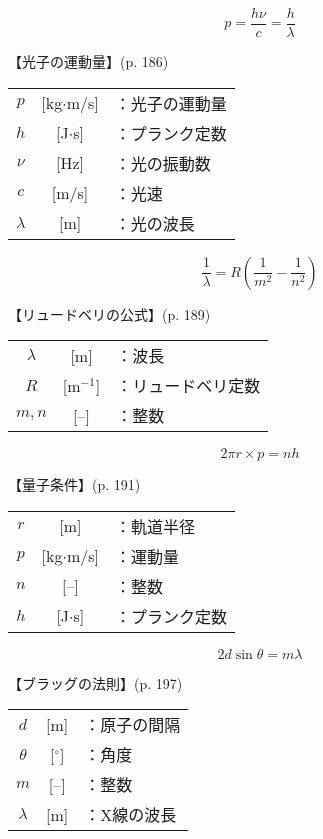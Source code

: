 \documentclass[10pt]{jarticle}
\begin{document}
\newpage
\[
  p = \frac{h\nu}{c} = \frac{h}{\lambda}
\]


\vskip3mm
\noindent
【光子の運動量】{\footnotesize (p. 186)}

\begin{tabular}{ccl}
$p$	&[kg$\cdot$m/s]	&：光子の運動量 \\
$h$	&{[J$\cdot$s]}	&：プランク定数 \\
$\nu$	&[Hz]	&：光の振動数 \\
$c$	&[m/s]	&：光速 \\
$\lambda$	&[m]	&：光の波長 \\
\end{tabular}





\newpage
\[
  \frac{1}{\lambda} = R \left(\frac{1}{m^2} - \frac{1}{n^2} \right)
\]


\vskip3mm
\noindent
【リュードベリの公式】{\footnotesize (p. 189)}

\begin{tabular}{ccl}
$\lambda$	&[m]	&：波長 \\
  $R$	&[m$^{-1}$]	&：リュードベリ定数 \\
$m, n$	&[--]	&：整数
\end{tabular}





\newpage
\[
  2 \pi r \times p = nh
\]


\vskip3mm
\noindent
【量子条件】{\footnotesize (p. 191)}

\begin{tabular}{ccl}
$r$	&[m]	&：軌道半径 \\
$p$	&[kg$\cdot$m/s]	&：運動量 \\
$n$	&[--]	&：整数 \\
$h$	&{[J$\cdot$s]}	&：プランク定数
\end{tabular}



\newpage
\[
  2d \sin\theta = m\lambda
  \]


\vskip3mm
\noindent
【ブラッグの法則】{\footnotesize (p. 197)}

\begin{tabular}{ccl}
$d$	&[m]	&：原子の間隔 \\
$\theta$	&[$^\circ$]	&：角度 \\
$m$	&[--]	&：整数 \\
$\lambda$	&{[m]}	&：X線の波長
\end{tabular}
\end{document}
